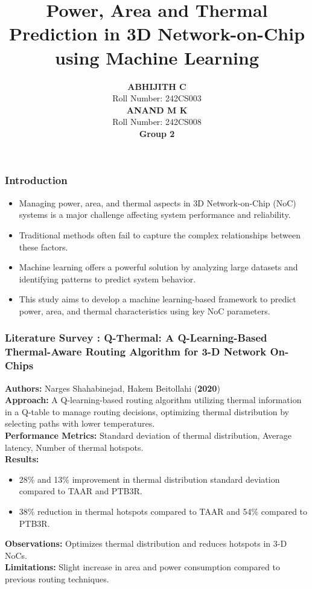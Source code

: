 \documentclass{beamer}
\title{Power, Area and Thermal Prediction in 3D Network-on-Chip using Machine Learning}
\author{
	\textbf{ABHIJITH C} \\ %
	Roll Number: 242CS003 \\ %
	\textbf{ANAND M K} \\ %
	Roll Number: 242CS008 \\ %
	\textbf{Group 2} 
}
\institute{
	Department of Computer Science and Engineering \\ 
	National Institute of Technology Karnataka (NITK) \\ 
	Surathkal, India
}
\date{} %
\begin{document}
	
	\frame{\titlepage}
	
\begin{frame}
\frametitle{Introduction}
\begin{itemize}
    \item Managing power, area, and thermal aspects in 3D Network-on-Chip (NoC) systems is a major challenge affecting system performance and reliability.
    \item Traditional methods often fail to capture the complex relationships between these factors.
    \item Machine learning offers a powerful solution by analyzing large datasets and identifying patterns to predict system behavior.
    \item This study aims to develop a machine learning-based framework to predict power, area, and thermal characteristics using key NoC parameters.
\end{itemize}
\end{frame}




\begin{frame}[fragile]
\frametitle{Literature Survey : Q-Thermal: A Q-Learning-Based Thermal-Aware Routing Algorithm for 3-D Network On-Chips}

\textbf{Authors:} Narges Shahabinejad, Hakem Beitollahi (\textbf{2020}) \\
\textbf{Approach:} A Q-learning-based routing algorithm utilizing thermal information in a Q-table to manage routing decisions, optimizing thermal distribution by selecting paths with lower temperatures. \\
\textbf{Performance Metrics:} Standard deviation of thermal distribution, Average latency, Number of thermal hotspots. \\
\textbf{Results:} 
\begin{itemize}
    \item 28\% and 13\% improvement in thermal distribution standard deviation compared to TAAR and PTB3R.
    \item 38\% reduction in thermal hotspots compared to TAAR and 54\% compared to PTB3R.
\end{itemize}
\textbf{Observations:} Optimizes thermal distribution and reduces hotspots in 3-D NoCs. \\
\textbf{Limitations:} Slight increase in area and power consumption compared to previous routing techniques.
\end{frame}
\end{document}
